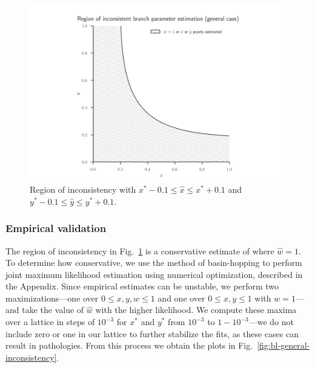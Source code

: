 \documentclass{article}
\begin{document}
\begin{figure}
\centering
\includegraphics[width=.9\textwidth]{bl-loose-inconsistency-inkscape}
\caption{Region of inconsistency with $x^*-0.1 \le \hat{x} \le x^*+0.1$ and $y^*-0.1 \le \hat{y} \le y^*+0.1$.}
\label{fig:bl-loose-inconsistency}
\end{figure}

\subsubsection*{Empirical validation}

The region of inconsistency in Fig.~\ref{fig:bl-loose-inconsistency} is a conservative estimate of where $\hat{w}=1$.
To determine how conservative, we use the method of basin-hopping \cite{Wales1997} to perform joint maximum likelihood estimation using numerical optimization, described in the Appendix.
Since empirical estimates can be unstable, we perform two maximizations---one over $0 \le x,y,w \le 1$ and one over $0 \le x,y \le 1$ with $w=1$---and take the value of $\hat{w}$ with the higher likelihood.
We compute these maxima over a lattice in steps of $10^{-3}$ for $x^*$ and $y^*$ from $10^{-3}$ to $1-10^{-3}$---we do not include zero or one in our lattice to further stabilize the fits, as these cases can result in pathologies.
From this process we obtain the plots in Fig.~\ref{fig:bl-general-inconsistency}.
\end{document}
